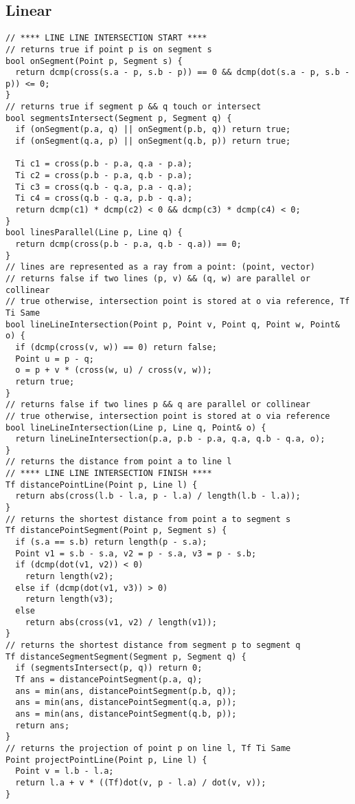 \documentclass[FSZ,a4paper,onesided]{article}
\begin{document}
\begin{multicols*}{\COLS}
\subsection{Linear}
\begin{lstlisting}
// **** LINE LINE INTERSECTION START ****
// returns true if point p is on segment s
bool onSegment(Point p, Segment s) {
  return dcmp(cross(s.a - p, s.b - p)) == 0 && dcmp(dot(s.a - p, s.b - p)) <= 0;
}
// returns true if segment p && q touch or intersect
bool segmentsIntersect(Segment p, Segment q) {
  if (onSegment(p.a, q) || onSegment(p.b, q)) return true;
  if (onSegment(q.a, p) || onSegment(q.b, p)) return true;

  Ti c1 = cross(p.b - p.a, q.a - p.a);
  Ti c2 = cross(p.b - p.a, q.b - p.a);
  Ti c3 = cross(q.b - q.a, p.a - q.a);
  Ti c4 = cross(q.b - q.a, p.b - q.a);
  return dcmp(c1) * dcmp(c2) < 0 && dcmp(c3) * dcmp(c4) < 0;
}
bool linesParallel(Line p, Line q) {
  return dcmp(cross(p.b - p.a, q.b - q.a)) == 0;
}
// lines are represented as a ray from a point: (point, vector)
// returns false if two lines (p, v) && (q, w) are parallel or collinear
// true otherwise, intersection point is stored at o via reference, Tf Ti Same
bool lineLineIntersection(Point p, Point v, Point q, Point w, Point& o) {
  if (dcmp(cross(v, w)) == 0) return false;
  Point u = p - q;
  o = p + v * (cross(w, u) / cross(v, w));
  return true;
}
// returns false if two lines p && q are parallel or collinear
// true otherwise, intersection point is stored at o via reference
bool lineLineIntersection(Line p, Line q, Point& o) {
  return lineLineIntersection(p.a, p.b - p.a, q.a, q.b - q.a, o);
}
// returns the distance from point a to line l
// **** LINE LINE INTERSECTION FINISH ****
Tf distancePointLine(Point p, Line l) {
  return abs(cross(l.b - l.a, p - l.a) / length(l.b - l.a));
}
// returns the shortest distance from point a to segment s
Tf distancePointSegment(Point p, Segment s) {
  if (s.a == s.b) return length(p - s.a);
  Point v1 = s.b - s.a, v2 = p - s.a, v3 = p - s.b;
  if (dcmp(dot(v1, v2)) < 0)
    return length(v2);
  else if (dcmp(dot(v1, v3)) > 0)
    return length(v3);
  else
    return abs(cross(v1, v2) / length(v1));
}
// returns the shortest distance from segment p to segment q
Tf distanceSegmentSegment(Segment p, Segment q) {
  if (segmentsIntersect(p, q)) return 0;
  Tf ans = distancePointSegment(p.a, q);
  ans = min(ans, distancePointSegment(p.b, q));
  ans = min(ans, distancePointSegment(q.a, p));
  ans = min(ans, distancePointSegment(q.b, p));
  return ans;
}
// returns the projection of point p on line l, Tf Ti Same
Point projectPointLine(Point p, Line l) {
  Point v = l.b - l.a;
  return l.a + v * ((Tf)dot(v, p - l.a) / dot(v, v));
}
\end{lstlisting}

\end{multicols*}
\end{document}
